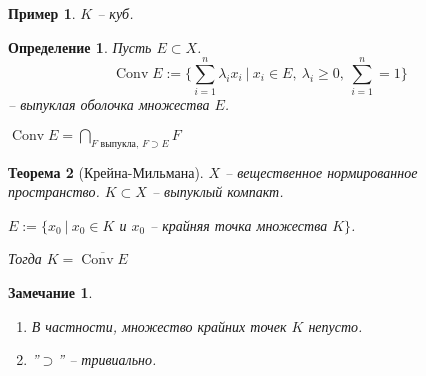 \documentclass[12pt,a4paper]{report}
\DeclareMathOperator*{\Conv}{Conv}
\newcommand{\sm}{\sum\limits}
\newtheorem{thm}{Теорема}[section]
\newtheorem{dfn}[thm]{Определение}
\newtheorem*{note}{Замечание}
\newtheorem*{ex}{Пример}%
\begin{document}
\begin{ex}
$K$ -- куб.
\end{ex}

\begin{dfn}
Пусть $E \subset X$.
$$\Conv E := \{ \sm_{i=1}^n \lambda_i x_i \ \big| \ x_i \in E, \ \lambda_i \ge 0, \ \sm_{i=1}^n = 1\} $$ -- выпуклая оболочка множества $E$.

$\Conv E = \bigcap\limits_{F \text{ выпукла, }F \supset E} F$
\end{dfn}

\begin{thm}[Крейна-Мильмана]

$X$ -- вещественное нормированное пространство. $K \subset X$ -- выпуклый компакт.

$E := \{ x_0 \ \big| \ x_0 \in K$ и $x_0$ -- крайняя точка множества $K \}$.

Тогда $K  = \overline{\Conv E}$
\end{thm}

\begin{note}
\begin{enumerate}
\item
В частности, множество крайних точек $K$ непусто.

\item
''$\supset$'' -- тривиально.
\end{enumerate}
\end{note}
\end{document}
